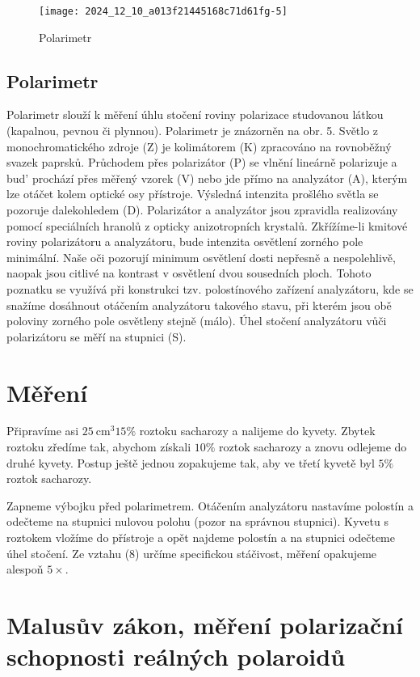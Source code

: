 \documentclass[czech,11pt,a4paper]{article}
\begin{document}
\begin{multicols}{2}
	\begin{figure}[H]
		\texttt{[image: 2024\_12\_10\_a013f21445168c71d61fg-5]}
		\caption{Polarimetr}
	\end{figure}
	

	
	\subsection*{Polarimetr}
	Polarimetr slouží k měření úhlu stočení roviny polarizace studovanou látkou (kapalnou, pevnou či plynnou). Polarimetr je znázorněn na obr. 5. Světlo z monochromatického zdroje (Z) je kolimátorem (K) zpracováno na rovnoběžný svazek paprsků. Průchodem přes polarizátor (P) se vlnění lineárně polarizuje a bud’ prochází přes měřený vzorek (V) nebo jde přímo na analyzátor (A), kterým lze otáčet kolem optické osy přístroje. Výsledná intenzita prošlého světla se pozoruje dalekohledem (D). Polarizátor a analyzátor jsou zpravidla realizovány pomocí speciálních hranolů z opticky anizotropních krystalů. Zkřížíme-li kmitové roviny polarizátoru a analyzátoru, bude intenzita osvětlení zorného pole minimální. Naše oči pozorují minimum osvětlení dosti nepřesně a nespolehlivě, naopak jsou citlivé na kontrast v osvětlení dvou sousedních ploch. Tohoto poznatku se využívá při konstrukci tzv. polostínového zařízení analyzátoru, kde se snažíme dosáhnout otáčením analyzátoru takového stavu, při kterém jsou obě poloviny zorného pole osvětleny stejně (málo). Úhel stočení analyzátoru vůči polarizátoru se měří na stupnici (S).
	
	\section*{Měření}
	Připravíme asi $25 \mathrm{~cm}^{3} 15 \%$ roztoku sacharozy a nalijeme do kyvety. Zbytek roztoku zředíme tak, abychom získali $10 \%$ roztok sacharozy a znovu odlejeme do druhé kyvety. Postup ještě jednou zopakujeme tak, aby ve třetí kyvetě byl $5 \%$ roztok sacharozy.
	
	Zapneme výbojku před polarimetrem. Otáčením analyzátoru nastavíme polostín a odečteme na stupnici nulovou polohu (pozor na správnou stupnici). Kyvetu s roztokem vložíme do přístroje a opět najdeme polostín a na stupnici odečteme úhel stočení. Ze vztahu (8) určíme specifickou stáčivost, měření opakujeme alespoň $5 \times$.
	

	
	\section*{Malusův zákon, měření polarizační schopnosti reálných polaroidů}

\end{multicols}
\end{document}
